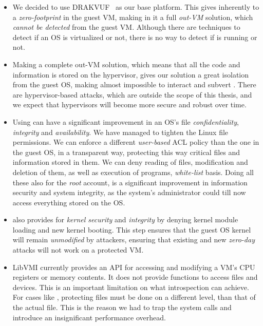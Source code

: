 \begin{itemize}
\item We decided to use DRAKVUF~\cite{lengyel2014drakvuf} as our base platform. This gives inherently to  a \emph{zero-footprint} in the guest \ac{VM}, making in it a full \emph{out-\ac{VM}} solution, which \emph{cannot be detected} from the guest \ac{VM}. Although there are techniques to detect if an \ac{OS} is virtualized or not, there is no way to detect if  is running or not.

\item Making  a complete out-\ac{VM} solution, which means that all the code and information is stored on the hypervisor, gives our solution a great isolation from the guest \ac{OS}, making almost impossible to interact and subvert . There are hypervisor-based attacks, which are outside the scope of this thesis, and we expect that hypervisors will become more secure and robust over time.

\item Using  can have a significant improvement in an \ac{OS}'s file \emph{confidentiality}, \emph{integrity} and \emph{availability}. We have managed to tighten the Linux file permissions. We can enforce a different \emph{user-based}  \ac{ACL} policy than the one in the guest \ac{OS}, in a transparent way, protecting this way critical files and information stored in them. We can deny reading of files, modification and deletion of them, as well as execution of programs,  \emph{white-list} basis. Doing all these also for the \emph{root} account, is a significant improvement in information security and system integrity, as the system's administrator could till now access everything stored on the \ac{OS}.

\item {} also provides for \emph{kernel security} and \emph{integrity} by denying kernel module loading and new kernel booting. This step ensures that the guest \ac{OS} kernel will remain \emph{unmodified} by attackers, ensuring that existing and new \emph{zero-day} attacks will not work on a  protected \ac{VM}.

\item LibVMI currently provides an \ac{API} for accessing and modifying a \ac{VM}'s \ac{CPU} registers or memory contents. It does not provide functions to access files and devices. This is an important limitation on what introspection can achieve. For cases like , protecting files must be done on a different level, than that of the actual file. This is the reason we had to trap the system calls and introduce an insignificant performance overhead.


\end{itemize}
